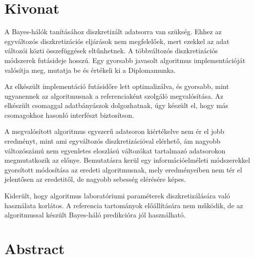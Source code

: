 \setcounter{page}{1}

\selecthungarian

\chapter*{Kivonat}

A Bayes-hálók tanításához diszkretizált adatsorra van szükség. Ehhez az egyváltozós diszkretizációs eljárások nem megfelelőek, mert ezekkel az adat változói közti összefüggések eltűnhetnek. A többváltozós diszkretizációs módszerek futásideje hosszú. Egy gyorsabb javasolt algoritmus implementációját valósítja meg, mutatja be és értékeli ki a Diplomamunka.

Az elkészült implementáció futásidőre lett optimalizálva, és gyorsabb, mint ugyanennek az algoritmusnak a referenciaként szolgáló megvalósítása. Az elkészült csomaggal adatbányászok dolgozhatnak, úgy készült el, hogy más csomagokhoz hasonló interfészt biztosítson.

A megvalósított algoritmus egyszerű adatsoron kiértékelve nem ér el jobb eredményt, mint ami egyváltozós diszkretizációval elérhető, ám nagyobb változószámú nem egyenletes eloszlású változókat tartalmazó adatsorokon megmutatkozik az előnye. Bemutatásra kerül egy információelméleti módszerekkel gyorsított módosítása az eredeti algoritmusnak, mely eredményeiben nem tér el jelentősen az eredetitől, de nagyobb sebesség elérésére képes.

Kiderült, hogy algoritmus laboratóriumi paraméterek diszkretizálására való használata korlátos. A referencia tartományok előállítására nem működik, de az algoritmussal készült Bayes-háló predikcióra jól használható.

\vfill
\selectenglish


\chapter*{Abstract}




\vfill
\selectthesislanguage

\setcounter{romanPage}{\value{page}}
